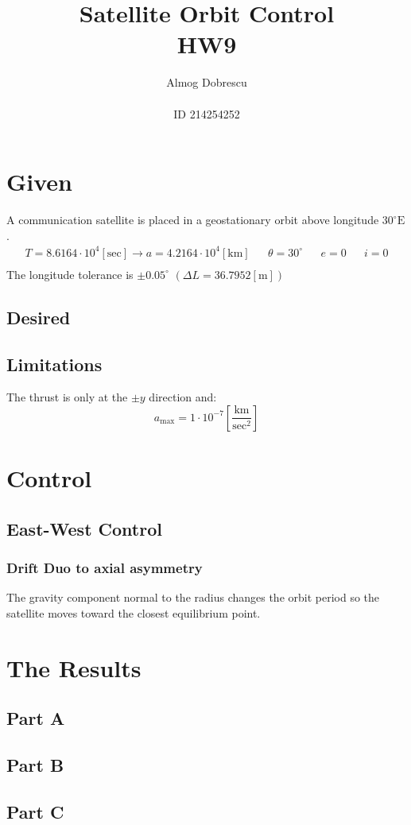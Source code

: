 \documentclass[12pt, a4paper]{article}
\title{Satellite Orbit Control \\ HW9}
\author{Almog Dobrescu\\\\ID 214254252}
\begin{document}
\maketitle

\thispagestyle{empty}
\newpage
\setcounter{page}{1}

\tableofcontents
\vfil
\listoffigures
\newpage

\section{Given}
A communication satellite is placed in a geostationary orbit above longitude $30^\circ\mathrm{E}$.
\begin{equation}
    \begin{matrix}
        T=8.6164\cdot10^4\left[\mathrm{sec}\right]\rightarrow a=4.2164\cdot10^4\left[\mathrm{km}\right] && \theta=30^\circ && e=0 && i=0 \\
    \end{matrix}
\end{equation}
The longitude tolerance is $\pm0.05^\circ$ $\left(\Delta L=36.7952\left[\mathrm{m}\right]\right)$

\subsection{Desired}

\subsection{Limitations}
The thrust is only at the $\pm y$ direction and:
\begin{equation}
    a_{\mathrm{max}}=1\cdot10^{-7}\left[\frac{\mathrm{km}}{\mathrm{sec}^2}\right]
\end{equation}

\section{Control}
\subsection{East-West Control}
\subsubsection{Drift Duo to axial asymmetry}
The gravity component normal to the radius changes the orbit period so the satellite moves toward the closest equilibrium point.

\newpage

\section{The Results}
\subsection{Part A}

\subsection{Part B}

\subsection{Part C}
\end{document}
